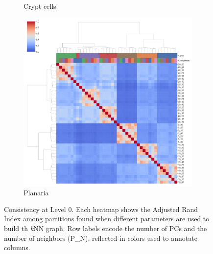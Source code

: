 \documentclass[11pt, titlepage, twoside]{article}
\begin{document}
\begin{figure}[H]
\begin{subfigure}[t]{0.3\textwidth}
        \caption{Crypt cells} \label{cm_crypt}
    \end{subfigure}
    \hfill
    \begin{subfigure}[t]{0.3\textwidth}
        \centering
        \includegraphics[width=\textwidth]{ClusterMap_L0_Panel5.pdf} 
        \caption{Planaria} \label{cm_planaria}
    \end{subfigure}
    \vspace{40pt}


\caption[]{Consistency at Level 0. Each heatmap shows the Adjusted Rand Index among partitions found when different parameters are used to build th \emph{k}NN graph. Row labels encode the number of PCs and the number of neighbors (P\_N), reflected in colors used to annotate columns.} \label{Figure_Clustermap_L0}
\end{figure}
\end{document}

